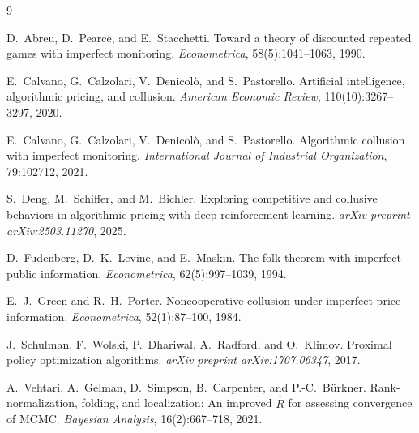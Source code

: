 \begin{thebibliography}{9}

D.~Abreu, D.~Pearce, and E.~Stacchetti.
\newblock Toward a theory of discounted repeated games with imperfect
  monitoring.
\newblock \emph{Econometrica}, 58(5):1041--1063, 1990.

E.~Calvano, G.~Calzolari, V.~Denicol\`o, and S.~Pastorello.
\newblock Artificial intelligence, algorithmic pricing, and collusion.
\newblock \emph{American Economic Review}, 110(10):3267--3297, 2020.

E.~Calvano, G.~Calzolari, V.~Denicol\`o, and S.~Pastorello.
\newblock Algorithmic collusion with imperfect monitoring.
\newblock \emph{International Journal of Industrial Organization}, 79:102712,
  2021.

S.~Deng, M.~Schiffer, and M.~Bichler.
\newblock Exploring competitive and collusive behaviors in algorithmic
  pricing with deep reinforcement learning.
\newblock \emph{arXiv preprint arXiv:2503.11270}, 2025.

D.~Fudenberg, D.~K.~Levine, and E.~Maskin.
\newblock The folk theorem with imperfect public information.
\newblock \emph{Econometrica}, 62(5):997--1039, 1994.

E.~J.~Green and R.~H.~Porter.
\newblock Noncooperative collusion under imperfect price information.
\newblock \emph{Econometrica}, 52(1):87--100, 1984.

J.~Schulman, F.~Wolski, P.~Dhariwal, A.~Radford, and O.~Klimov.
\newblock Proximal policy optimization algorithms.
\newblock \emph{arXiv preprint arXiv:1707.06347}, 2017.

A.~Vehtari, A.~Gelman, D.~Simpson, B.~Carpenter, and P.-C.~B\"urkner.
\newblock Rank-normalization, folding, and localization: An improved
  $\hat{R}$ for assessing convergence of {MCMC}.
\newblock \emph{Bayesian Analysis}, 16(2):667--718, 2021.

\end{thebibliography}

